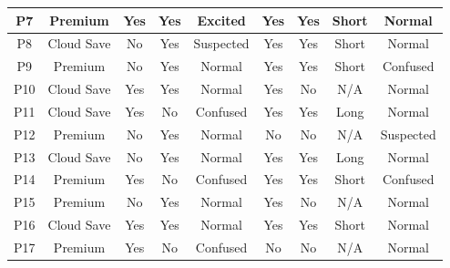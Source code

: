 \documentclass[letterpaper,twocolumn,10pt]{article}
\begin{document}
\begin{table}[h]
{\begin{tabular}{|c|cccc|cccc|}
P7 & \multicolumn{1}{c|}{Premium} & \multicolumn{1}{c|}{Yes} & \multicolumn{1}{c|}{Yes} & Excited & \multicolumn{1}{c|}{Yes} & \multicolumn{1}{c|}{Yes} & \multicolumn{1}{c|}{Short} & Normal \\ \hline
P8 & \multicolumn{1}{c|}{Cloud Save} & \multicolumn{1}{c|}{No} & \multicolumn{1}{c|}{Yes} & Suspected & \multicolumn{1}{c|}{Yes} & \multicolumn{1}{c|}{Yes} & \multicolumn{1}{c|}{Short} & Normal \\ \hline
P9 & \multicolumn{1}{c|}{Premium} & \multicolumn{1}{c|}{No} & \multicolumn{1}{c|}{Yes} & Normal & \multicolumn{1}{c|}{Yes} & \multicolumn{1}{c|}{Yes} & \multicolumn{1}{c|}{Short} & Confused \\ \hline
P10 & \multicolumn{1}{c|}{Cloud Save} & \multicolumn{1}{c|}{Yes} & \multicolumn{1}{c|}{Yes} & Normal & \multicolumn{1}{c|}{Yes} & \multicolumn{1}{c|}{No} & \multicolumn{1}{c|}{N/A} & Normal \\ \hline
P11 & \multicolumn{1}{c|}{Cloud Save} & \multicolumn{1}{c|}{Yes} & \multicolumn{1}{c|}{No} & Confused & \multicolumn{1}{c|}{Yes} & \multicolumn{1}{c|}{Yes} & \multicolumn{1}{c|}{Long} & Normal \\ \hline
P12 & \multicolumn{1}{c|}{Premium} & \multicolumn{1}{c|}{No} & \multicolumn{1}{c|}{Yes} & Normal & \multicolumn{1}{c|}{No} & \multicolumn{1}{c|}{No} & \multicolumn{1}{c|}{N/A} & Suspected \\ \hline
P13 & \multicolumn{1}{c|}{Cloud Save} & \multicolumn{1}{c|}{No} & \multicolumn{1}{c|}{Yes} & Normal & \multicolumn{1}{c|}{Yes} & \multicolumn{1}{c|}{Yes} & \multicolumn{1}{c|}{Long} & Normal \\ \hline
P14 & \multicolumn{1}{c|}{Premium} & \multicolumn{1}{c|}{Yes} & \multicolumn{1}{c|}{No} & Confused & \multicolumn{1}{c|}{Yes} & \multicolumn{1}{c|}{Yes} & \multicolumn{1}{c|}{Short} & Confused \\ \hline
P15 & \multicolumn{1}{c|}{Premium} & \multicolumn{1}{c|}{No} & \multicolumn{1}{c|}{Yes} & Normal & \multicolumn{1}{c|}{Yes} & \multicolumn{1}{c|}{No} & \multicolumn{1}{c|}{N/A} & Normal \\ \hline
P16 & \multicolumn{1}{c|}{Cloud Save} & \multicolumn{1}{c|}{Yes} & \multicolumn{1}{c|}{Yes} & Normal & \multicolumn{1}{c|}{Yes} & \multicolumn{1}{c|}{Yes} & \multicolumn{1}{c|}{Short} & Normal \\ \hline
P17 & \multicolumn{1}{c|}{Premium} & \multicolumn{1}{c|}{Yes} & \multicolumn{1}{c|}{No} & Confused & \multicolumn{1}{c|}{No} & \multicolumn{1}{c|}{No} & \multicolumn{1}{c|}{N/A} & Normal \\ \hline

\end{tabular}}
\end{table}
\end{document}
